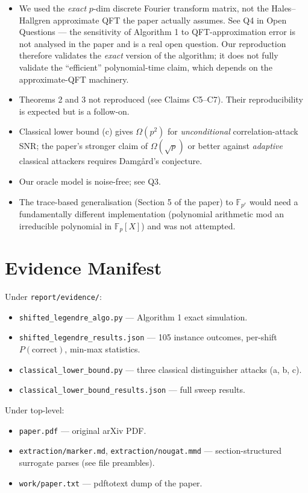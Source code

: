 \documentclass[11pt]{article}
\begin{document}
\begin{itemize}
  \item We used the \emph{exact} $p$-dim discrete Fourier transform matrix,
    not the Hales--Hallgren approximate QFT the paper actually assumes.
    See Q4 in Open Questions --- the sensitivity of Algorithm 1 to
    QFT-approximation error is not analysed in the paper and is a real
    open question. Our reproduction therefore validates the \emph{exact}
    version of the algorithm; it does not fully validate the ``efficient''
    polynomial-time claim, which depends on the approximate-QFT
    machinery.
  \item Theorems 2 and 3 not reproduced (see Claims C5--C7). Their
    reproducibility is expected but is a follow-on.
  \item Classical lower bound (c) gives $\Omega(p^2)$ for
    \emph{unconditional} correlation-attack SNR; the paper's stronger
    claim of $\Omega(\sqrt p)$ or better against \emph{adaptive}
    classical attackers requires Damgård's conjecture.
  \item Our oracle model is noise-free; see Q3.
  \item The trace-based generalisation (Section 5 of the paper) to
    $\mathbb{F}_{p^r}$ would need a fundamentally different implementation
    (polynomial arithmetic mod an irreducible polynomial in $\mathbb{F}_p[X]$)
    and was not attempted.
\end{itemize}

\section{Evidence Manifest}

Under \verb|report/evidence/|:
\begin{itemize}
  \item \verb|shifted_legendre_algo.py| — Algorithm 1 exact simulation.
  \item \verb|shifted_legendre_results.json| — 105 instance outcomes,
    per-shift $P(\text{correct})$, min-max statistics.
  \item \verb|classical_lower_bound.py| — three classical distinguisher
    attacks (a, b, c).
  \item \verb|classical_lower_bound_results.json| — full sweep results.
\end{itemize}

Under top-level:
\begin{itemize}
  \item \verb|paper.pdf| — original arXiv PDF.
  \item \verb|extraction/marker.md|, \verb|extraction/nougat.mmd| —
    section-structured surrogate parses (see file preambles).
  \item \verb|work/paper.txt| — pdftotext dump of the paper.
\end{itemize}
\end{document}
